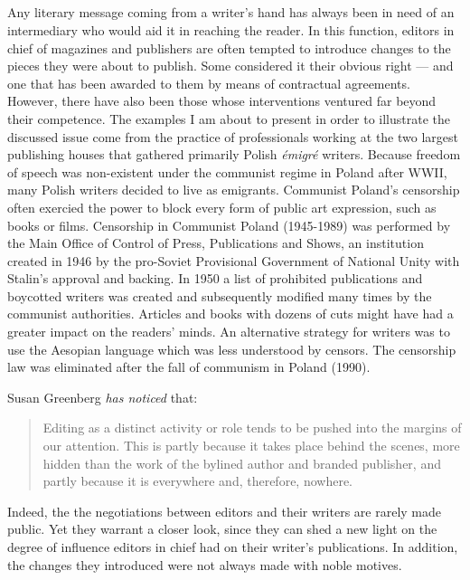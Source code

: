 \begin{paper}
\section*{} 
Any literary message coming from a writer's hand has always been
in need of an intermediary who would aid it in reaching the reader. In this function, editors in chief of magazines and publishers are often tempted to introduce
changes to the pieces they were about to publish. Some considered it
their obvious right --- and one that has been awarded to them by means of contractual agreements. However, there have also been those whose interventions ventured far beyond their
competence. The examples I am about to present in order to illustrate
the discussed issue come from the practice of professionals working at
the two largest publishing houses that gathered primarily Polish \textit{émigré}
writers. Because freedom of speech was non-existent under the communist regime
in Poland after WWII, many Polish writers decided to live
as emigrants. Communist Poland's censorship often exercied the power to
block every form of public art expression, such as books or films. Censorship
in Communist Poland (1945-1989) was performed by the Main Office of
Control of Press, Publications and Shows, an institution created in 1946 by
the pro-Soviet Provisional Government of National Unity with Stalin's
approval and backing. In 1950 a list of prohibited publications and
boycotted writers was created and subsequently modified many times by
the communist authorities. Articles and books with dozens of cuts might have
had a greater impact on the readers' minds. An alternative strategy for writers was to use the Aesopian language which was less understood by censors. The
censorship law was eliminated after the fall of communism in Poland
(1990).

Susan Greenberg \emph{\emph{has noticed}} that: 

\begin{quote}
Editing as a distinct
activity or role tends to be pushed into the margins of our attention.
This is partly because it takes place behind the scenes, more hidden
than the work of the bylined author and branded publisher, and partly
because it is everywhere and, therefore, nowhere. 
\begin{flushright}
\citep[8]{greenberg_when_2010} 
\end{flushright}
\end{quote}

\noindent Indeed, the  the
negotiations between editors and their writers are rarely made
public. Yet they warrant a closer look, since they can shed a new light on the degree
of influence  editors in chief had on their writer's publications. In addition,  the changes they introduced were not
always made with noble motives.


\end{paper}
